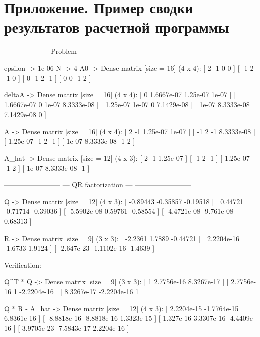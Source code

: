 \documentclass[a4paper,14pt]{extarticle}
\newenvironment{tinyverbatim}%
{\footnotesize\verbatim}%
{\endverbatim}
\begin{document}


\section{Приложение. Пример сводки результатов расчетной программы}

\begin{tinyverbatim}
---------------
--- Problem ---
---------------

epsilon -> 1e-06
N       -> 4
A0      -> Dense matrix [size = 16] (4 x 4):
  [  2 -1  0  0 ]
  [ -1  2 -1  0 ]
  [  0 -1  2 -1 ]
  [  0  0 -1  2 ]

deltaA  -> Dense matrix [size = 16] (4 x 4):
  [          0 1.6667e-07   1.25e-07      1e-07 ]
  [ 1.6667e-07          0      1e-07 8.3333e-08 ]
  [   1.25e-07      1e-07          0 7.1429e-08 ]
  [      1e-07 8.3333e-08 7.1429e-08          0 ]

A       -> Dense matrix [size = 16] (4 x 4):
  [        2         -1 1.25e-07      1e-07 ]
  [       -1          2       -1 8.3333e-08 ]
  [ 1.25e-07         -1        2         -1 ]
  [    1e-07 8.3333e-08       -1          2 ]

A_hat   -> Dense matrix [size = 12] (4 x 3):
  [        2         -1 1.25e-07 ]
  [       -1          2       -1 ]
  [ 1.25e-07         -1        2 ]
  [    1e-07 8.3333e-08       -1 ]

------------------------
--- QR factorization ---
------------------------

Q             -> Dense matrix [size = 12] (4 x 3):
  [    -0.89443   -0.35857 -0.19518 ]
  [     0.44721   -0.71714 -0.39036 ]
  [ -5.5902e-08    0.59761 -0.58554 ]
  [ -4.4721e-08 -9.761e-08  0.68313 ]

R             -> Dense matrix [size = 9] (3 x 3):
  [    -2.2361      1.7889 -0.44721 ]
  [ 2.2204e-16     -1.6733   1.9124 ]
  [ -2.647e-23 -1.1102e-16  -1.4639 ]

Verification:

Q^T * Q       -> Dense matrix [size = 9] (3 x 3):
  [          1  2.7756e-16  8.3267e-17 ]
  [ 2.7756e-16           1 -2.2204e-16 ]
  [ 8.3267e-17 -2.2204e-16           1 ]

Q * R - A_hat -> Dense matrix [size = 12] (4 x 3):
  [  2.2204e-15 -1.7764e-15  6.8361e-16 ]
  [ -8.8818e-16 -8.8818e-16  1.3323e-15 ]
  [   1.327e-16  3.3307e-16 -4.4409e-16 ]
  [  3.9705e-23 -7.5843e-17  2.2204e-16 ]


\end{tinyverbatim}
\end{document}
